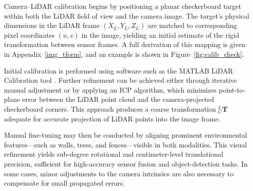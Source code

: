 \documentclass[../main.tex]{subfiles}
\begin{document}

Camera–LiDAR calibration begins by positioning a planar checkerboard target within both the LiDAR field of view and the camera image.  
The target’s physical dimensions in the LiDAR frame $(X_L, Y_L, Z_L)$ are matched to corresponding pixel coordinates $(u,v)$ in the image, yielding an initial estimate of the rigid transformation between sensor frames.  
A full derivation of this mapping is given in Appendix~\ref{img_tform}, and an example is shown in Figure~\ref{fig:calib_check}.

Initial calibration is performed using software such as the MATLAB LiDAR Calibration tool \cite{matlab_calibration}.  
Further refinement can be achieved either through iterative manual adjustment or by applying an \ac{ICP} algorithm, which minimizes point-to-plane error between the LiDAR point cloud and the camera-projected checkerboard corners.  
This approach produces a coarse transformation $_{C}^{L}\mathbf{T}$ adequate for accurate projection of LiDAR points into the image frame.

Manual fine-tuning may then be conducted by aligning prominent environmental features—such as walls, trees, and fences—visible in both modalities.  
This visual refinement yields sub-degree rotational and centimeter-level translational precision, sufficient for high-accuracy sensor fusion and object-detection tasks.  
In some cases, minor adjustments to the camera intrinsics are also necessary to compensate for small propagated errors.

\end{document}
